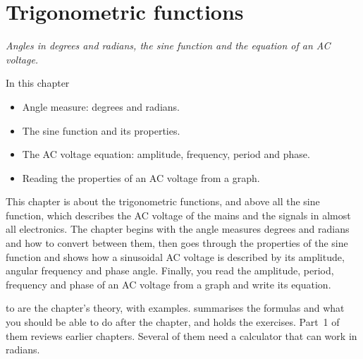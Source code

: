 
\chapter{Trigonometric functions}
\label{c9:ch}

{\large\itshape Angles in degrees and radians, the sine function and the equation of an AC
voltage.\par}

\begin{chapterbox}{In this chapter}
\begin{itemize}
  \item Angle measure: degrees and radians.
  \item The sine function and its properties.
  \item The AC voltage equation: amplitude, frequency, period and phase.
  \item Reading the properties of an AC voltage from a graph.
\end{itemize}
\end{chapterbox}

This chapter is about the trigonometric functions, and above all the sine function, which
describes the AC voltage of the mains and the signals in almost all electronics. The chapter
begins with the angle measures degrees and radians and how to convert between them, then goes
through the properties of the sine function and shows how a sinusoidal AC voltage is described by
its amplitude, angular frequency and phase angle. Finally, you read the amplitude, period,
frequency and phase of an AC voltage from a graph and write its equation.

 to  are the chapter's theory, with examples.
 summarises the formulas and what you should be able to do after the
chapter, and  holds the exercises. Part~1 of them reviews earlier
chapters. Several of them need a calculator that can work in radians.




